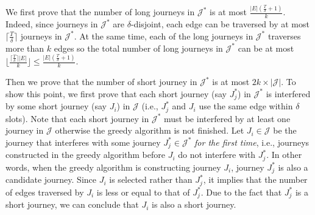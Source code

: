 \documentclass[10pt, conference, letterpaper]{IEEEtran}
\begin{document}
We first prove that the number of long journeys in $\mathcal{J}^*$ is at most $\frac{|E|(\frac{T}{\delta}+1)}{k}$.  Indeed, since journeys in $\mathcal{J}^*$ are $\delta$-disjoint, each edge can be traversed by at most $\lceil\frac{T}{\delta}\rceil$ journeys in $\mathcal{J}^*$. At the same time, each of the long journeys in $\mathcal{J}^*$ traverses more than $k$ edges so the total number of long journeys in $\mathcal{J}^*$ can be at most $\lfloor \frac{\lceil\frac{T}{\delta}\rceil|E|}{k}\rfloor\le \frac{|E|(\frac{T}{\delta}+1)}{k}$.


Then we prove that the number of short journey in $\mathcal{J}^*$ is at most $2k\times |\mathcal{J}|$. To show this point, we first prove that each short journey (say $J_j^*$) in $\mathcal{J}^*$ is interfered by some short journey (say $J_i$) in $\mathcal{J}$ (i.e., $J^*_j$ and $J_i$ use the same edge within $\delta$ slots). Note that each short journey in $\mathcal{J}^*$ must be interfered by at least one journey in $\mathcal{J}$ otherwise the greedy algorithm is not finished. Let $J_i\in \mathcal{J}$ be the journey that interferes with some journey $J^*_j\in\mathcal{J}^*$ \emph{for the first time}, i.e., journeys constructed in the greedy algorithm before $J_i$ do not interfere with $J^*_j$. In other words, when the greedy algorithm is constructing journey $J_i$, journey $J^*_j$ is also a candidate journey. Since $J_i$ is selected rather than $J^*_j$, it implies that the number of edges traversed by $J_i$ is less or equal to that of $J^*_j$. Due to the fact that $J^*_j$ is a short journey, we can conclude that $J_i$ is also a short journey.
\end{document}
